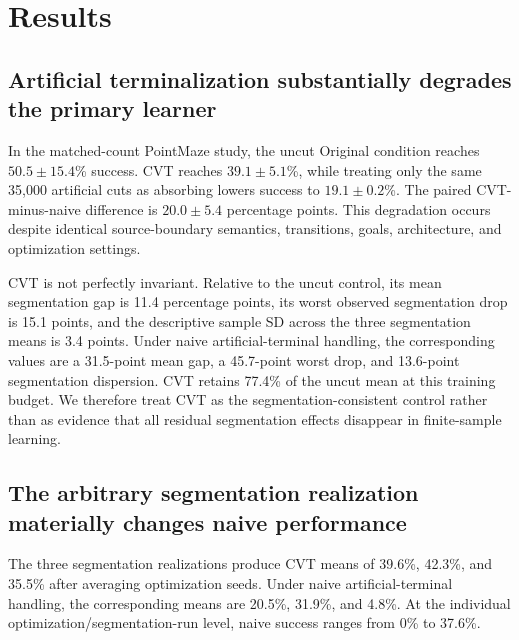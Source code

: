 \section{Results}

\begin{table}[t]
  \centering
  \caption{Final five-task success (\%, mean $\pm$ sample SD over optimization seeds). In the primary study, the three segmentation realizations are averaged within each optimization seed before aggregation. The independent NS validation uses one fixed segmentation realization. The final column reports the paired CVT-minus-naive difference.}
  \label{tab:main-results}
  
\end{table}

\subsection{Artificial terminalization substantially degrades the primary learner}

In the matched-count PointMaze study, the uncut Original condition reaches $50.5\pm15.4$\% success. CVT reaches $39.1\pm5.1$\%, while treating only the same 35,000 artificial cuts as absorbing lowers success to $19.1\pm0.2$\%. The paired CVT-minus-naive difference is $20.0\pm5.4$ percentage points. This degradation occurs despite identical source-boundary semantics, transitions, goals, architecture, and optimization settings.

CVT is not perfectly invariant. Relative to the uncut control, its mean segmentation gap is 11.4 percentage points, its worst observed segmentation drop is 15.1 points, and the descriptive sample SD across the three segmentation means is 3.4 points. Under naive artificial-terminal handling, the corresponding values are a 31.5-point mean gap, a 45.7-point worst drop, and 13.6-point segmentation dispersion. CVT retains 77.4\% of the uncut mean at this training budget. We therefore treat CVT as the segmentation-consistent control rather than as evidence that all residual segmentation effects disappear in finite-sample learning.

\subsection{The arbitrary segmentation realization materially changes naive performance}

The three segmentation realizations produce CVT means of 39.6\%, 42.3\%, and 35.5\% after averaging optimization seeds. Under naive artificial-terminal handling, the corresponding means are 20.5\%, 31.9\%, and 4.8\%. At the individual optimization/segmentation-run level, naive success ranges from 0\% to 37.6\%.

